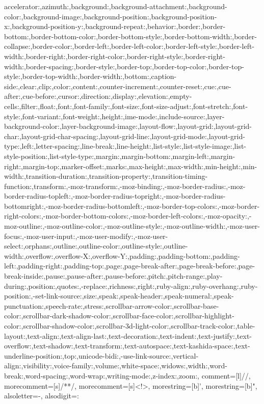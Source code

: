 {{accelerator:,azimuth:,background:,background-attachment:,background-color:,background-image:,background-position:,background-position-x:,background-position-y:,background-repeat:,behavior:,border:,border-bottom:,border-bottom-color:,border-bottom-style:,border-bottom-width:,border-collapse:,border-color:,border-left:,border-left-color:,border-left-style:,border-left-width:,border-right:,border-right-color:,border-right-style:,border-right-width:,border-spacing:,border-style:,border-top:,border-top-color:,border-top-style:,border-top-width:,border-width:,bottom:,caption-side:,clear:,clip:,color:,content:,counter-increment:,counter-reset:,cue:,cue-after:,cue-before:,cursor:,direction:,display:,elevation:,empty-cells:,filter:,float:,font:,font-family:,font-size:,font-size-adjust:,font-stretch:,font-style:,font-variant:,font-weight:,height:,ime-mode:,include-source:,layer-background-color:,layer-background-image:,layout-flow:,layout-grid:,layout-grid-char:,layout-grid-char-spacing:,layout-grid-line:,layout-grid-mode:,layout-grid-type:,left:,letter-spacing:,line-break:,line-height:,list-style:,list-style-image:,list-style-position:,list-style-type:,margin:,margin-bottom:,margin-left:,margin-right:,margin-top:,marker-offset:,marks:,max-height:,max-width:,min-height:,min-width:,transition-duration:,transition-property:,transition-timing-function:,transform:,-moz-transform:,-moz-binding:,-moz-border-radius:,-moz-border-radius-topleft:,-moz-border-radius-topright:,-moz-border-radius-bottomright:,-moz-border-radius-bottomleft:,-moz-border-top-colors:,-moz-border-right-colors:,-moz-border-bottom-colors:,-moz-border-left-colors:,-moz-opacity:,-moz-outline:,-moz-outline-color:,-moz-outline-style:,-moz-outline-width:,-moz-user-focus:,-moz-user-input:,-moz-user-modify:,-moz-user-select:,orphans:,outline:,outline-color:,outline-style:,outline-width:,overflow:,overflow-X:,overflow-Y:,padding:,padding-bottom:,padding-left:,padding-right:,padding-top:,page:,page-break-after:,page-break-before:,page-break-inside:,pause:,pause-after:,pause-before:,pitch:,pitch-range:,play-during:,position:,quotes:,-replace:,richness:,right:,ruby-align:,ruby-overhang:,ruby-position:,-set-link-source:,size:,speak:,speak-header:,speak-numeral:,speak-punctuation:,speech-rate:,stress:,scrollbar-arrow-color:,scrollbar-base-color:,scrollbar-dark-shadow-color:,scrollbar-face-color:,scrollbar-highlight-color:,scrollbar-shadow-color:,scrollbar-3d-light-color:,scrollbar-track-color:,table-layout:,text-align:,text-align-last:,text-decoration:,text-indent:,text-justify:,text-overflow:,text-shadow:,text-transform:,text-autospace:,text-kashida-space:,text-underline-position:,top:,unicode-bidi:,-use-link-source:,vertical-align:,visibility:,voice-family:,volume:,white-space:,widows:,width:,word-break:,word-spacing:,word-wrap:,writing-mode:,z-index:,zoom:},
    comment=[l]{//},
    morecomment=[s]{/*}{*/},
    morecomment=[s]{<!}{>},
    morestring=[b]',
    morestring=[b]",
    alsoletter={-},
    alsodigit={:}
}

